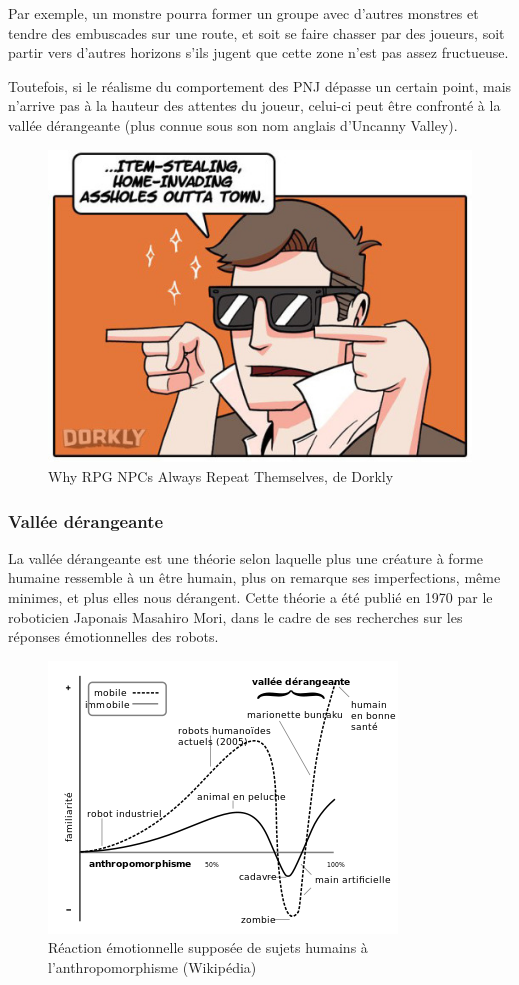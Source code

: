 \documentclass[a4paper, 12pt]{article} %
\begin{document}
Par exemple, un monstre pourra former un groupe avec d’autres monstres et tendre des embuscades sur une route, et soit se faire chasser par des joueurs, soit partir vers d’autres horizons s’ils jugent que cette zone n’est pas assez fructueuse.

Toutefois, si le réalisme du comportement des PNJ dépasse un certain point, mais n’arrive pas à la hauteur des attentes du joueur, celui-ci peut être confronté à la vallée dérangeante (plus connue sous son nom anglais d’Uncanny Valley).

\begin{figure}[!h]%
	\begin{center} 
		\includegraphics[width=0.60\columnwidth]{images/repeat4.png}%
		\caption{Why RPG NPCs Always Repeat Themselves, de Dorkly}%
	\end{center}
\end{figure}

\newpage
\subsubsection{Vallée dérangeante}

La vallée dérangeante est une théorie selon laquelle plus une créature à forme humaine ressemble à un être humain, plus on remarque ses imperfections, même minimes, et plus elles nous dérangent. Cette théorie a été publié en 1970 par le roboticien Japonais Masahiro Mori, dans le cadre de ses recherches sur les réponses émotionnelles des robots.

\begin{figure}[!h]%
	\begin{center} 
		\includegraphics[width=0.60\columnwidth]{images/uncannyValley.png}%
		\caption{Réaction émotionnelle supposée de sujets humains à l'anthropomorphisme (Wikipédia) }%
	\end{center}
\end{figure}
\end{document}
